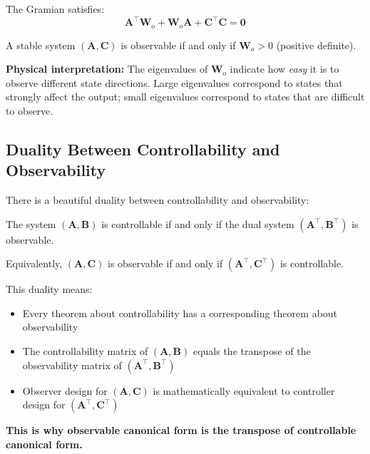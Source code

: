 The Gramian satisfies:
\begin{equation}
\mathbf{A}^\top\mathbf{W}_o + \mathbf{W}_o\mathbf{A} + \mathbf{C}^\top\mathbf{C} = \mathbf{0}
\label{eq:lyapunov_observability}
\end{equation}

\begin{theorem}
A stable system $(\mathbf{A}, \mathbf{C})$ is observable if and only if $\mathbf{W}_o > 0$ (positive definite).
\end{theorem}

\textbf{Physical interpretation:} The eigenvalues of $\mathbf{W}_o$ indicate how \textit{easy} it is to observe different state directions. Large eigenvalues correspond to states that strongly affect the output; small eigenvalues correspond to states that are difficult to observe.

\subsection{Duality Between Controllability and Observability}

There is a beautiful duality between controllability and observability:

\begin{theorem}[Duality]
\label{thm:duality}
The system $(\mathbf{A}, \mathbf{B})$ is controllable if and only if the dual system $(\mathbf{A}^\top, \mathbf{B}^\top)$ is observable.

Equivalently, $(\mathbf{A}, \mathbf{C})$ is observable if and only if $(\mathbf{A}^\top, \mathbf{C}^\top)$ is controllable.
\end{theorem}

This duality means:
\begin{itemize}
    \item Every theorem about controllability has a corresponding theorem about observability
    \item The controllability matrix of $(\mathbf{A}, \mathbf{B})$ equals the transpose of the observability matrix of $(\mathbf{A}^\top, \mathbf{B}^\top)$
    \item Observer design for $(\mathbf{A}, \mathbf{C})$ is mathematically equivalent to controller design for $(\mathbf{A}^\top, \mathbf{C}^\top)$
\end{itemize}

\textbf{This is why observable canonical form is the transpose of controllable canonical form.}

